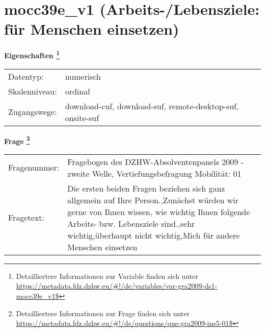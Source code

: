 
    \setcounter{footnote}{0}

    \vspace*{-1.8cm}
	\section{mocc39e\_v1 (Arbeits-/Lebensziele: für Menschen einsetzen)}
	\label{section:mocc39e_v1}



    \vspace*{0.5cm}
    \noindent\textbf{Eigenschaften
	\footnote{Detailliertere Informationen zur Variable finden sich unter
		\url{https://metadata.fdz.dzhw.eu/\#!/de/variables/var-gra2009-ds1-mocc39e_v1$}}}\\
	\begin{tabularx}{\hsize}{@{}lX}
	Datentyp: & numerisch \\
	Skalenniveau: & ordinal \\
	Zugangswege: &
	  download-cuf, 
	  download-suf, 
	  remote-desktop-suf, 
	  onsite-suf
 \\
    \end{tabularx}



				\vspace*{0.5cm}
                \noindent\textbf{Frage
	                \footnote{Detailliertere Informationen zur Frage finden sich unter
		              \url{https://metadata.fdz.dzhw.eu/\#!/de/questions/que-gra2009-ins5-01$}}}\\
				\begin{tabularx}{\hsize}{@{}lX}
					Fragenummer: &
					  Fragebogen des DZHW-Absolventenpanels 2009 - zweite Welle, Vertiefungsbefragung Mobilität:
					  01
 \\
					Fragetext: & Die ersten beiden Fragen beziehen sich ganz allgemein auf Ihre Person.,Zunächst würden wir gerne von Ihnen wissen, wie wichtig Ihnen folgende Arbeits- bzw. Lebensziele sind.,sehr wichtig,überhaupt nicht wichtig,Mich für andere Menschen einsetzen \\
				\end{tabularx}






